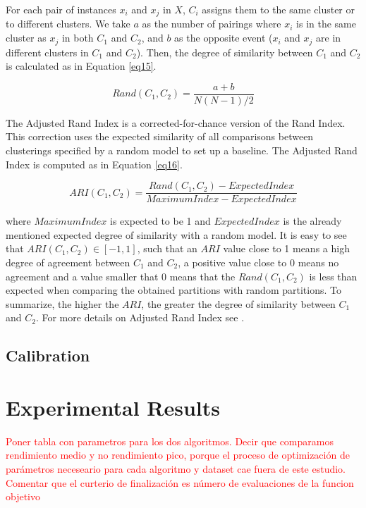 \documentclass[review]{elsarticle}
\begin{document}
For each pair of instances $x_i$ and $x_j$ in $X$, $C_i$ assigns them to the same cluster or to different clusters. We take $a$ as the number of pairings where $x_i$ is in the same cluster as $x_j$ in both $C_1$ and $C_2$, and $b$ as the opposite event ($x_i$ and $x_j$ are in different clusters in $C_1$ and $C_2$). Then, the degree of similarity between $C_1$ and $C_2$ is calculated as in Equation \eqref{eq15}.

\begin{equation}
Rand(C_1, C_2) = \frac{a + b}{N(N - 1)/2}
\label{eq15}
\end{equation}

The Adjusted Rand Index is a corrected-for-chance version of the Rand Index. This correction uses the expected similarity of all comparisons between clusterings specified by a random model to set up a baseline. The Adjusted Rand Index is computed as in Equation \eqref{eq16}.

\begin{equation}
ARI(C_1, C_2) = \frac{Rand(C_1, C_2) - ExpectedIndex}{MaximumIndex - ExpectedIndex}
\label{eq16}
\end{equation}

where $MaximumIndex$ is expected to be 1 and $ExpectedIndex$ is the already mentioned expected degree of similarity with a random model. It is easy to see that $ARI(C_1, C_2) \in [-1,1]$, such that an $ARI$ value close to 1 means a high degree of agreement between $C_1$ and $C_2$, a positive value close to 0 means no agreement and a value smaller that 0 means that the $Rand(C_1, C_2)$ is less than expected when comparing the obtained partitions with random partitions. To summarize, the higher the $ARI$, the greater the degree of similarity between $C_1$ and $C_2$. For more details on Adjusted Rand Index see \cite{hubert1985comparing}.


\subsection{Calibration}

\clearpage

\section{Experimental Results}

\textcolor{red}{Poner tabla con parametros para los dos algoritmos. Decir que comparamos rendimiento medio y no rendimiento pico, porque el proceso de optimización de parámetros neceseario para cada algoritmo y dataset cae fuera de este estudio. Comentar que el curterio de finalización es número de evaluaciones de la funcion objetivo}
\end{document}
